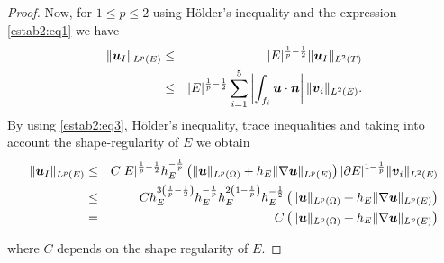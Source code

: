 \begin{proof}
Now, for $1\le p\le 2$ using H\"older's inequality and the expression \eqref{estab2:eq1} we have
\begin{eqnarray*}
\|\boldsymbol{u}_I\|_{L^p(E)}&\le& |E|^{\frac1p-\frac12}\|\boldsymbol{u}_I\|_{L^2(T)}\\&\le&|E|^{\frac1p-\frac12} \sum_{i=1}^5  \left|\int_{f_i}\boldsymbol{u}\cdot\boldsymbol{n}\right|\|\boldsymbol{v}_i\|_{L^2(E)}.
\end{eqnarray*}
By using \eqref{estab2:eq3}, H\"older's inequality, trace inequalities and taking into account the shape-regularity of $E$ we obtain
\begin{eqnarray*}
\|\boldsymbol{u}_I\|_{L^p(E)}&\le& C |E|^{\frac1p-\frac12} h_E^{-\frac1p}\left(\|\boldsymbol{u}\|_{L^p(\Omega)}+h_E\|\nabla\boldsymbol{u}\|_{L^p(E)}\right)|\partial E|^{1-\frac1p} \|\boldsymbol{v}_i\|_{L^2(E)}\\&\le& C h_E^{3\left(\frac1p-\frac12\right)}h_E^{-\frac1p}h_E^{2\left(1-\frac1p\right)} h_E^{-\frac12}\left(\|\boldsymbol{u}\|_{L^p(\Omega)}+h_E\|\nabla\boldsymbol{u}\|_{L^p(E)}\right)\\&=& C \left(\|\boldsymbol{u}\|_{L^p(\Omega)}+h_E\|\nabla\boldsymbol{u}\|_{L^p(E)}\right)
\end{eqnarray*}



where $C$ depends on the shape regularity of $E$.
\end{proof}
